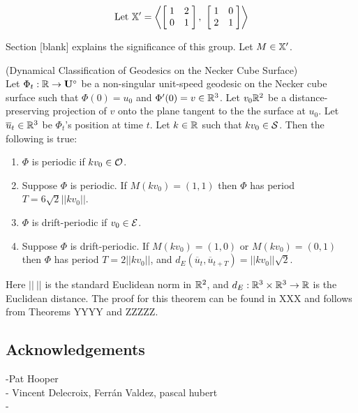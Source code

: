 \documentclass[]{article}
\def\<{\langle} \def\>{\rangle}
\begin{document}
\begin{align}
\text{Let }\XX'=\left\< \left[ \hspace{1mm} \begin{matrix}
							1 & 2\\
							 0 & 1
						\end{matrix}\hspace{1mm}\right],~
\left[ \hspace{1mm} \begin{matrix}
							1 & 0\\
							 2 & 1
						\end{matrix}\hspace{1mm}\right]\right\>
\end{align}

\noindent Section [blank] explains the significance of this group. Let $M\in\mathbb{X}'$.


\begin{thm*}
(Dynamical Classification of Geodesics on the Necker Cube Surface) \\Let $\Phi_t:\mathbb{R}\rightarrow\mathbf{U}^\circ$ be a non-singular unit-speed geodesic on the Necker cube surface such that $\Phi(0)=u_0$ and $\Phi'(0)=v\in\mathbb{R}^3$. Let $v_0\mathbb{R}^2$ be a distance-preserving projection of $v$ onto the plane tangent to the the surface at $u_0$. Let $\overline{u}_t\in\mathbb{R}^3$ be $\Phi_t$'s position at time $t$. Let $k\in\mathbb{R}$ such that $kv_0\in\mathcal{S}$. Then the following is true:
\begin{enumerate}[label=(\roman*)]
\item $\Phi$ is periodic if $kv_0\in\mathcal{O}$.
\item Suppose $\Phi$ is periodic. If $M (kv_0)=(1,1)$ then $\Phi$ has period $T=6\sqrt{2}||kv_0||$.
\item $\Phi$ is drift-periodic if $v_0\in\mathcal{E}$. 
\item Suppose $\Phi$ is drift-periodic. If $M (kv_0)=(1,0)$ or $M (kv_0)=(0,1)$ then $\Phi$ has period $T=2||kv_0||$, and $d_E(\overline{u}_t,\overline{u}_{t+T})=||kv_0||\sqrt{2}$.
\end{enumerate}
\end{thm*}

Here $||~||$ is the standard Euclidean norm in $\mathbb{R}^2$, and $d_E:\mathbb{R}^3\times\mathbb{R}^3\rightarrow\mathbb{R}$ is the Euclidean distance. The proof for this theorem can be found in XXX and follows from Theorems YYYY and ZZZZZ.

\subsection{Acknowledgements}
-Pat Hooper\\
- Vincent Delecroix, Ferrán Valdez, pascal hubert\\
- \\
\end{document}
